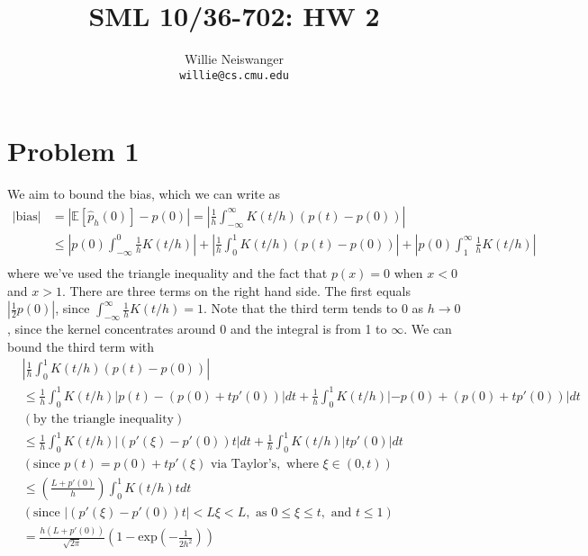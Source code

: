 \documentclass[12pt]{article}
\title{SML 10/36-702: HW 2}
\author{Willie Neiswanger\\
\texttt{willie@cs.cmu.edu}}
\begin{document}
\maketitle

\section*{Problem 1}
\label{sec:prob1}
We aim to bound the bias, which we can write as
\begin{equation}
    \begin{split}
        | \text{bias} |
        &= | \mathbb{E}\left[\hat{p}_h(0)\right] - p(0) | 
            = \left| \frac{1}{h} \int_{-\infty}^{\infty} K(t/h)(p(t)-p(0)) \right| \\
        &\leq  \left| p(0) \int_{-\infty}^0 \frac{1}{h} K(t/h) \right|
            + \left| \frac{1}{h} \int_0^1 K(t/h)(p(t)-p(0)) \right|
            + \left| p(0) \int_1^{\infty} \frac{1}{h} K(t/h) \right| \\
    \end{split}
\end{equation}
where we've used the triangle inequality and the fact that $p(x)=0$ when $x<0$ and $x>1$. There are
three terms on the right hand side. The first equals $|\frac{1}{2}p(0)|$, since 
$\int_{-\infty}^{\infty} \frac{1}{h} K(t/h) = 1$. Note that the third term tends to 0 as
$h \rightarrow 0$, since the kernel concentrates around 0 and the integral is from 1 to $\infty$.
We can bound the third term with
\begin{equation*}
    \begin{split}
        &\left| \frac{1}{h} \int_0^1 K(t/h)(p(t)-p(0)) \right| \\
        &\leq \frac{1}{h}\int_0^1 K(t/h) |p(t) - (p(0) + tp'(0))|dt
            + \frac{1}{h}\int_0^1 K(t/h) |-p(0) + (p(0) + tp'(0))|dt \\
        &(\text{by the triangle inequality})\\
        &\leq \frac{1}{h}\int_0^1 K(t/h) |(p'(\xi) - p'(0)) t| dt
            + \frac{1}{h}\int_0^1 K(t/h) |t p'(0)| dt \\
            &(\text{since } p(t) = p(0) + tp'(\xi) \text{ via Taylor's}, \text{ where }\xi \in (0,t))\\
        &\leq \left( \frac{L+p'(0)}{h} \right) \int_0^1 K(t/h) t dt \\
        &(\text{since } |(p'(\xi) - p'(0)) t| < L\xi < L, \text{ as } 0 \leq \xi \leq t, \text{ and } t \leq 1) \\
        &= \frac{h(L+p'(0))}{\sqrt{2\pi}} \left(1 - \text{exp}\left(-\frac{1}{2h^2}\right) \right)
    \end{split}
\end{equation*}
\end{document}
